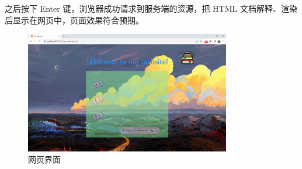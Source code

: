 \documentclass[UTF8,a4paper,10pt]{ctexart}
\begin{document}
之后按下 Enter 键，浏览器成功请求到服务端的资源，把 HTML 文档解释、渲染后显示在网页中，页面效果符合预期。
\begin{figure}[H]
    \centering
\includegraphics[width=0.8\textwidth]{img/网页界面.png}
    \caption{网页界面}
\end{figure}
\end{document}
